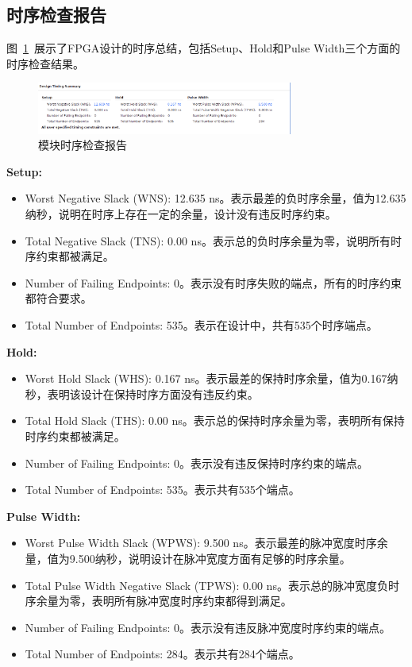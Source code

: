 \subsection{时序检查报告}

图~\ref{fig:exp6:timing}~展示了FPGA设计的时序总结，包括Setup、Hold和Pulse Width三个方面的时序检查结果。

\begin{figure}[htbp]
  \centering
  \includegraphics[width=0.75\textwidth]{figure/exp6/timing_summary.png}
  \caption{模块时序检查报告}
  \label{fig:exp6:timing}
\end{figure}


\textbf{Setup:}  
\begin{itemize}
  \item Worst Negative Slack (WNS): 12.635 ns。表示最差的负时序余量，值为12.635纳秒，说明在时序上存在一定的余量，设计没有违反时序约束。  
\item Total Negative Slack (TNS): 0.00 ns。表示总的负时序余量为零，说明所有时序约束都被满足。  
\item Number of Failing Endpoints: 0。表示没有时序失败的端点，所有的时序约束都符合要求。  
\item Total Number of Endpoints: 535。表示在设计中，共有535个时序端点。
\end{itemize}


\textbf{Hold:}  
\begin{itemize}
\item Worst Hold Slack (WHS): 0.167 ns。表示最差的保持时序余量，值为0.167纳秒，表明该设计在保持时序方面没有违反约束。  
\item Total Hold Slack (THS): 0.00 ns。表示总的保持时序余量为零，表明所有保持时序约束都被满足。  
\item Number of Failing Endpoints: 0。表示没有违反保持时序约束的端点。  
\item Total Number of Endpoints: 535。表示共有535个端点。
\end{itemize}

\textbf{Pulse Width:}  
\begin{itemize}
  \item Worst Pulse Width Slack (WPWS): 9.500 ns。表示最差的脉冲宽度时序余量，值为9.500纳秒，说明设计在脉冲宽度方面有足够的时序余量。  
  \item Total Pulse Width Negative Slack (TPWS): 0.00 ns。表示总的脉冲宽度负时序余量为零，表明所有脉冲宽度时序约束都得到满足。  
  \item Number of Failing Endpoints: 0。表示没有违反脉冲宽度时序约束的端点。  
\item Total Number of Endpoints: 284。表示共有284个端点。
\end{itemize}


